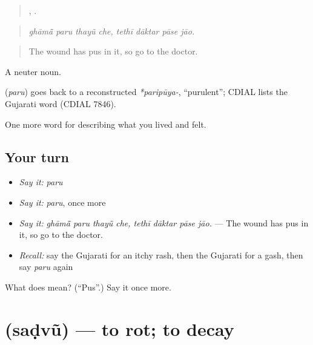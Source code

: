 \begin{quote}
   ,    .
\end{quote}

\begin{quote}
\emph{ghāmā̃ paru thayũ che, tethī dāktar pāse jāo.}
\end{quote}

\begin{quote}
The wound has pus in it, so go to the doctor.
\end{quote}

A neuter noun.

\begin{cousinweb}
\textbf{} (\emph{paru}) goes back to a reconstructed \emph{*paripūya-}, \textquotedblleft{}purulent\textquotedblright{}; CDIAL lists the Gujarati word (CDIAL 7846).
\end{cousinweb}

\begin{grammarlens}[title={What you've built}]
One more word for describing what you lived and felt.
\end{grammarlens}

\subsection*{Your turn}
\begin{itemize}
\raggedright
  \item \emph{Say it:} \emph{paru}
  \item \emph{Say it:} \emph{paru}, once more
  \item \emph{Say it:} \emph{ghāmā̃ paru thayũ che, tethī dāktar pāse jāo.} — The wound has pus in it, so go to the doctor.
  \item \emph{Recall:} say the Gujarati for an itchy rash, then the Gujarati for a gash, then say \emph{paru} again
\end{itemize}

\begin{tcolorbox}[breakable,colback=teal!4,colframe=teal!35!black,title={Before you move on}]
What does  mean? (\textquotedblleft{}Pus\textquotedblright{}.) Say it once more.
\end{tcolorbox}
\section[\texorpdfstring{\gu{સડવું} (saḍvũ)}{સડવું (saḍvũ)}]{ (saḍvũ) — to rot; to decay}

